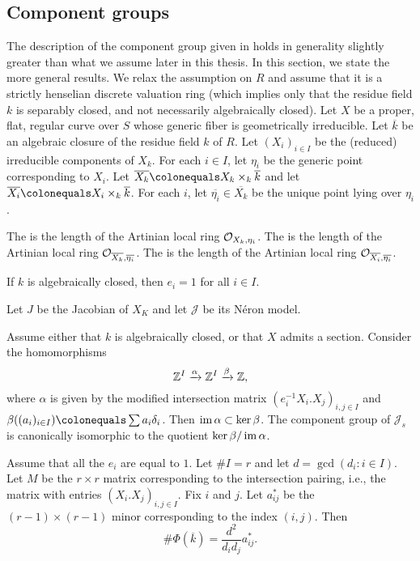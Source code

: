 \subsection{Component groups}\label{introcomp}
The description of the component group given in \cite[Section 9.6]{blr} holds in generality slightly greater than what we assume later in this thesis. In this section, we state the more general results. We relax the assumption on $R$ and assume that it is a strictly henselian discrete valuation ring (which implies only that the residue field $k$ is separably closed, and not necessarily algebraically closed). Let $X$ be a proper, flat, regular curve over $S$ whose generic fiber is geometrically irreducible. Let $\overline{k}$ be an algebraic closure of the residue field $k$ of $R$. Let $(X_i)_{i \in I}$ be the (reduced) irreducible components of $X_k$. For each $i \in I$, let $\eta_i$ be the generic point corresponding to $X_i$. Let $\overline{X_k} \colonequals X_k \times_k \overline{k}$ and let $\overline{X_i} \colonequals X_i \times_k \overline{k}$. For each $i$, let $\overline{\eta_i} \in \overline{X_k}$ be the unique point lying over $\eta_i$. 
\begin{defin}
 The {} is the length of the Artinian local ring $\mathcal{O}_{X_k,\eta_i}$. The {} is the length of the Artinian local ring $\mathcal{O}_{\overline{X_k},\overline{\eta_i}}$. The {} is the length of the Artinian local ring $\mathcal{O}_{\overline{X_i},\overline{\eta_i}}$.
\end{defin}
If $k$ is algebraically closed, then $e_i = 1$ for all $i \in I$.

Let $J$ be the Jacobian of $X_K$ and let $\mathcal{J}$ be its N\'{e}ron model. 
\begin{thm}\cite[Section~9.6, Theorem~1]{blr}\label{mainthmblr}
 Assume either that $k$ is algebraically closed, or that $X$ admits a section. Consider the homomorphisms
 \[ \mathbb Z^I \xrightarrow{\alpha} \mathbb Z^I \xrightarrow{\beta} \mathbb Z, \]
 where $\alpha$ is given by the modified intersection matrix $(e_i^{-1}X_i.X_j)_{i,j \in I}$ and $\beta((a_i)_{i \in I}) \colonequals \sum a_i \delta_i$. Then $\operatorname{im} \alpha \subset \ker \beta$. The component group of $\mathcal{J}_s$ is canonically isomorphic to the quotient $\ker \beta/\operatorname{im} \alpha$.
\end{thm}

\begin{corollary}\cite[Section~9.6, Corollary~4]{blr}\label{maincorblr}
 Assume that all the $e_i$ are equal to $1$. Let $\# I = r$ and let $d = \gcd(d_i \colon i \in I)$. Let $M$ be the $r \times r$ matrix corresponding to the intersection pairing, i.e., the matrix with entries $(X_i.X_j)_{i,j \in I}$. Fix $i$ and $j$. Let $a_{ij}^*$ be the $(r-1) \times (r-1)$ minor corresponding to the index $(i,j)$. Then
 \[ \# \Phi(\overline{k}) = \frac{d^2}{d_i d_j} a_{ij}^* . \]
\end{corollary}

